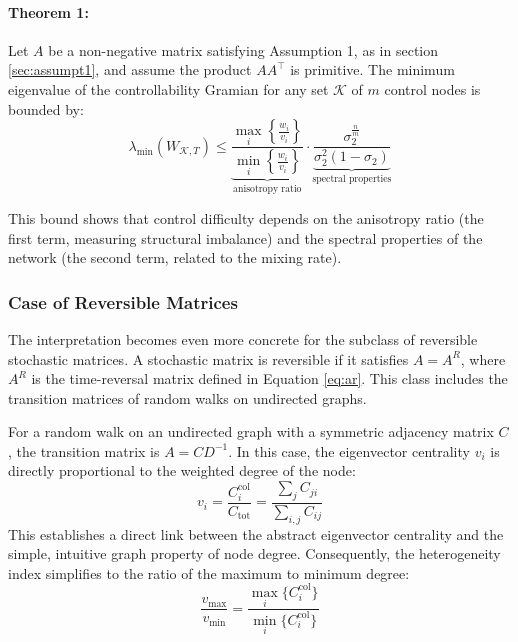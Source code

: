 \documentclass[10pt, a4paper]{article}
\begin{document}
\paragraph{Theorem 1:} Let $A$ be a non-negative matrix satisfying Assumption 1, as in section \ref{sec:assumpt1}, and assume the product $AA^{\top}$ is primitive. The minimum eigenvalue of the controllability Gramian for any set $\mathcal{K}$ of $m$ control nodes is bounded by:
\begin{equation}
    \lambda_{\min}(W_{\mathcal{K},T}) 
    \le 
    \underbrace{
        \frac{\max_{i}\left\{\frac{w_{i}}{v_{i}}\right\}}{\min_{i}\left\{\frac{w_{i}}{v_{i}}\right\}}
    }_{\text{anisotropy ratio}}
    \cdot
    \underbrace{
        \frac{\sigma_{2}^{\frac{n}{m} }}{\sigma_2^2(1 - \sigma_{2})}
    }_{\text{spectral properties}}
    \label{eq:main_bound}
\end{equation}


This bound shows that control difficulty depends on the anisotropy ratio (the first term, measuring structural imbalance) and the spectral properties of the network (the second term, related to the mixing rate).
\subsubsection{Case of Reversible Matrices}
The interpretation becomes even more concrete for the subclass of reversible stochastic matrices. A stochastic matrix is reversible if it satisfies $A=A^R$, where $A^R$ is the time-reversal matrix defined in Equation \ref{eq:ar}. This class includes the transition matrices of random walks on undirected graphs.

For a random walk on an undirected graph with a symmetric adjacency matrix $C$, the transition matrix is $A=CD^{-1}$. In this case, the eigenvector centrality $v_i$ is directly proportional to the weighted degree of the node:
\begin{equation}
    v_i = \frac{C_{i}^{\text{col}}}{C_{\text{tot}}} = \frac{\sum_{j}C_{ji}}{\sum_{i,j}C_{ij}}
\end{equation}
This establishes a direct link between the abstract eigenvector centrality and the simple, intuitive graph property of node degree. Consequently, the heterogeneity index simplifies to the ratio of the maximum to minimum degree:
\begin{equation}
    \frac{v_{\max}}{v_{\min}} = \frac{\max_{i}\{C_{i}^{\text{col}}\}}{\min_{i}\{C_{i}^{\text{col}}\}}
\end{equation}
\end{document}
